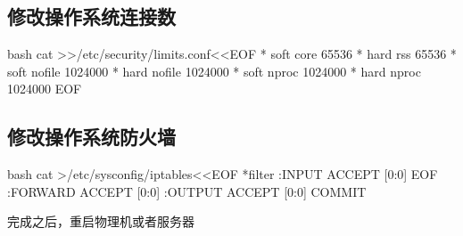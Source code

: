 \subsection{修改操作系统连接数}
\begin{code-block}{bash}
cat >>/etc/security/limits.conf<<EOF
*               soft    core            65536
*               hard    rss             65536
*               soft    nofile          1024000
*               hard    nofile          1024000
*               soft    nproc           1024000
*               hard    nproc           1024000
EOF
\end{code-block}

\subsection{修改操作系统防火墙}
\begin{code-block}{bash}
cat >/etc/sysconfig/iptables<<EOF
*filter
:INPUT ACCEPT [0:0]
EOF
:FORWARD ACCEPT [0:0]
:OUTPUT ACCEPT [0:0]
COMMIT
\end{code-block}

\noindent
完成之后，重启物理机或者服务器
\justifying
